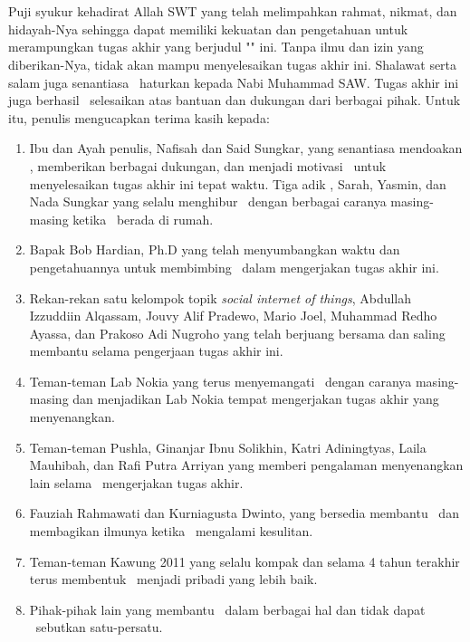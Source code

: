 \chapter*{\kataPengantar}
Puji syukur kehadirat Allah SWT yang telah melimpahkan rahmat, nikmat, dan hidayah-Nya sehingga \saya dapat memiliki kekuatan dan pengetahuan untuk merampungkan tugas akhir yang berjudul "\judul" ini. Tanpa ilmu dan izin yang diberikan-Nya, \saya tidak akan mampu menyelesaikan tugas akhir ini. Shalawat serta salam juga senantiasa \saya~haturkan kepada Nabi Muhammad SAW. Tugas akhir ini juga berhasil \saya~selesaikan atas bantuan dan dukungan dari berbagai pihak. Untuk itu, penulis mengucapkan terima kasih kepada:
\begin{enumerate}
	\item Ibu dan Ayah penulis, Nafisah dan Said Sungkar, yang senantiasa mendoakan \saya, memberikan berbagai dukungan, dan menjadi motivasi \saya~untuk menyelesaikan tugas akhir ini tepat waktu. Tiga adik \saya, Sarah, Yasmin, dan Nada Sungkar yang selalu menghibur \saya~dengan berbagai caranya masing-masing ketika \saya~berada di rumah.
	\item Bapak Bob Hardian, Ph.D yang telah menyumbangkan waktu dan pengetahuannya untuk membimbing \saya~dalam mengerjakan tugas akhir ini.
	\item Rekan-rekan satu kelompok topik \textit{social internet of things}, Abdullah Izzuddiin Alqassam, Jouvy Alif Pradewo, Mario Joel, Muhammad Redho Ayassa, dan Prakoso Adi Nugroho yang telah berjuang bersama dan saling membantu selama pengerjaan tugas akhir ini.
	\item Teman-teman Lab Nokia yang terus menyemangati \saya~dengan caranya masing-masing dan menjadikan Lab Nokia tempat mengerjakan tugas akhir yang menyenangkan.
	\item Teman-teman Pushla, Ginanjar Ibnu Solikhin, Katri Adiningtyas, Laila Mauhibah, dan Rafi Putra Arriyan yang memberi pengalaman menyenangkan lain selama \saya~mengerjakan tugas akhir.
	\item Fauziah Rahmawati dan Kurniagusta Dwinto, yang bersedia membantu \saya~dan membagikan ilmunya ketika \saya~mengalami kesulitan.
	\item Teman-teman Kawung 2011 yang selalu kompak dan selama 4 tahun terakhir terus membentuk \saya~menjadi pribadi yang lebih baik.
	\item Pihak-pihak lain yang membantu \saya~dalam berbagai hal dan tidak dapat \saya~sebutkan satu-persatu.
\end{enumerate}

